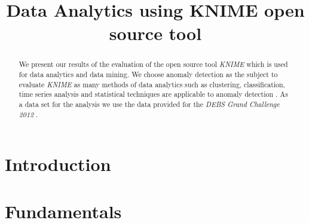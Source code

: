 \documentclass{dima}
\begin{document}

\title{Data Analytics using {\ttlit KNIME} open source tool}



\author{
}

\maketitle


\begin{abstract}
We present our results of the evaluation of the open source tool \textit{KNIME} which is used for data analytics and data mining. We choose anomaly detection as the subject to evaluate \textit{KNIME} as many methods of data analytics such as clustering, classification, time series analysis and statistical techniques are applicable to anomaly detection \cite{Chandola:2009:ADS:1541880.1541882}. As a data set for the analysis we use the data provided for the \textit{DEBS Grand Challenge 2012} \cite{Jerzak:2012:DGC:2335484.2335536}.
\end{abstract}


\section{Introduction}

\section{Fundamentals}
\end{document}
